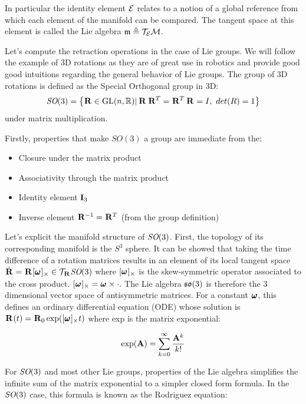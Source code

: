 In particular the identity element $\mathcal{E}$ relates to a notion of a global reference from which each element of the manifold can be compared.
The tangent space at this element is called the Lie algebra $\mathfrak{m} \triangleq \mathcal{T}_{\mathcal{E}}\mathcal{M}$.

Let's compute the retraction operations in the case of Lie groups. We will follow the example of 3D rotations as they are of great use in robotics and provide good
good intuitions regarding the general behavior of Lie groups.
The group of 3D rotations is defined as the Special Orthogonal group in 3D: 
\begin{equation}
    \textit{SO}(3) = \left\{\prescript{}{}{{\bf R}}_{} \in \text{GL}(n,\mathbb{R}) | \prescript{}{}{{\bf R}}_{}\prescript{}{}{{\bf R}}_{}^T=\prescript{}{}{{\bf R}}_{}^T\prescript{}{}{{\bf R}}_{}=I,~det(R)=1\right\}
\end{equation}
under matrix multiplication.


Firstly, properties that make $SO(3)$ a group are immediate from the:
%
\begin{itemize}
    \item Closure under the matrix product
    \item Associativity through the matrix product
    \item Identity element ${\bf I}_3$
    \item Inverse element $\prescript{}{}{{\bf R}}_{}^{-1} = \prescript{}{}{{\bf R}}_{}^T$ (from the group definition)
\end{itemize}
%
Let's explicit the manifold structure of $\textit{SO}(3)$. First, the topology of its corresponding manifold is the $S^3$ sphere.
It can be showed \cite{sola2018micro} that taking the time difference of a rotation matrices results in an element of its local tangent space
$\dot{\prescript{}{}{{\bf R}}_{}} = \prescript{}{}{{\bf R}}_{} [\prescript{}{}{\pmb{\omega}}_{}]_{\times} \in \mathcal{T}_{\prescript{}{}{{\bf R}}_{}}\textit{SO}(3)$ where $[\prescript{}{}{\pmb{\omega}}_{}]_{\times}$ is the skew-symmetric operator associated to the cross product. 
$[\prescript{}{}{\pmb{\omega}}_{}]_{\times} = \prescript{}{}{\pmb{\omega}}_{} \times \cdot$. The Lie algebra ${\mathfrak {so}}(3)$ is therefore the 3 dimensional vector space of antisymmetric matrices. 
For a constant $\prescript{}{}{\pmb{\omega}}_{}$, this defines an ordinary differential equation (ODE) whose solution
is $\prescript{}{}{{\bf R}}_{}(t)=\prescript{}{}{{\bf R}}_{0}\exp([\prescript{}{}{\pmb{\omega}}_{}]_{\times}t)$ where exp is the matrix exponential:

\begin{equation}
    \exp({\bf A}) = \sum_{k=0}^{\infty} \frac{{\bf A}^k}{k!}
\end{equation}

For $\textit{SO}(3)$ and most other Lie groups, properties of the Lie algebra simplifies the infinite sum of the matrix exponential to a simpler closed form formula. 
In the $\textit{SO}(3)$ case, this formula is known as the Rodriguez equation:

